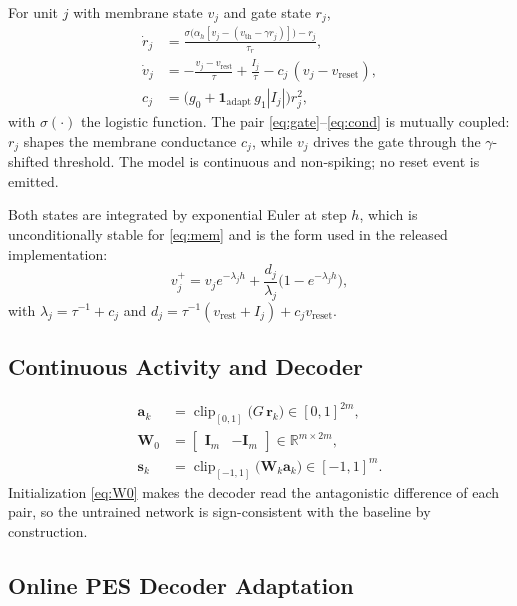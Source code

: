 \documentclass[letterpaper,10pt,conference]{IEEEtran}
\newcommand{\R}{\mathbb{R}}
\newcommand{\clip}{\operatorname{clip}}
\begin{document}
For unit $j$ with membrane state $v_j$ and gate state $r_j$,
\begin{align}
    \dot r_j &= \frac{\sigma\!\big(\alpha_h[v_j-(v_{\mathrm{th}}
        -\gamma r_j)]\big)-r_j}{\tau_r},
    \label{eq:gate}\\
    \dot v_j &= -\frac{v_j-v_{\mathrm{rest}}}{\tau}
        +\frac{I_j}{\tau}-c_j\,(v_j-v_{\mathrm{reset}}),
    \label{eq:mem}\\
    c_j &= \big(g_0+\mathbf 1_{\mathrm{adapt}}\,g_1|I_j|\big)r_j^{2},
    \label{eq:cond}
\end{align}
with $\sigma(\cdot)$ the logistic function. The pair
\eqref{eq:gate}--\eqref{eq:cond} is mutually coupled: $r_j$ shapes the
membrane conductance $c_j$, while $v_j$ drives the gate through the
$\gamma$-shifted threshold. The model is continuous and non-spiking; no
reset event is emitted.

Both states are integrated by exponential Euler at step $h$, which is
unconditionally stable for \eqref{eq:mem} and is the form used in the
released implementation:
\begin{equation}
    v_j^{+}=v_je^{-\lambda_jh}
      +\frac{d_j}{\lambda_j}\big(1-e^{-\lambda_jh}\big),
    \label{eq:expeuler}
\end{equation}
with $\lambda_j=\tau^{-1}+c_j$ and
$d_j=\tau^{-1}(v_{\mathrm{rest}}+I_j)+c_jv_{\mathrm{reset}}$.

\subsection{Continuous Activity and Decoder}

\begin{align}
    \bm a_k &= \clip_{[0,1]}\!\big(G\,\bm r_k\big)\in[0,1]^{2m},
    \label{eq:act}\\
    \bm W_0 &= \begin{bmatrix}\bm I_m&-\bm I_m\end{bmatrix}\in\R^{m\times2m},
    \label{eq:W0}\\
    \bm s_k &= \clip_{[-1,1]}\!\big(\bm W_k\bm a_k\big)\in[-1,1]^m .
    \label{eq:decode}
\end{align}
Initialization \eqref{eq:W0} makes the decoder read the antagonistic
difference of each pair, so the untrained network is sign-consistent with
the baseline by construction.

\subsection{Online PES Decoder Adaptation}
\end{document}
